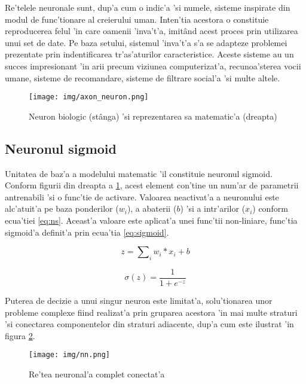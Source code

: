 \documentclass[12pt,a4paper,twoside]{report}
\begin{document}
Re'telele neuronale sunt, dup'a cum o indic'a 'si numele, sisteme inspirate din modul de func'tionare al creierului uman. Inten'tia acestora o constituie reproducerea felul 'in care oamenii 'inva't'a, imit\^and acest proces prin utilizarea unui set de date. Pe baza setului, sistemul 'inva't'a s'a se adapteze problemei prezentate prin indentificarea tr'as'aturilor caracteristice. Aceste sisteme au un succes impresionant 'in arii precum viziunea computerizat'a, recunoa'sterea vocii umane, sisteme de recomandare, sisteme de filtrare social'a 'si multe altele.

\begin{figure}[H]
  \centering
  \texttt{[image: img/axon\_neuron.png]}
  \centering
  \caption{Neuron biologic (st\^anga) 'si reprezentarea sa matematic'a (dreapta) \protect\footnotemark}
  \label{fig:axon_neuron}
\end{figure}

\newpage
\subsection{Neuronul sigmoid}
Unitatea de baz'a a modelului matematic 'il constituie neuronul sigmoid. Conform figurii din dreapta a \ref{fig:axon_neuron}, acest element con'tine un num'ar de parametrii antrenabili 'si o func'tie de activare. Valoarea neactivat'a a neuronului este alc'atuit'a pe baza ponderilor ($w_i$), a abaterii ($b$) 'si a intr'arilor ($x_i$) conform ecua'tiei \ref{eq:ns}. Aceast'a valoare este aplicat'a unei func'tii non-liniare, func'tia sigmoid'a definit'a prin ecua'tia \ref{eq:sigmoid}.

\begin{equation}
z = \sum\nolimits_{i} w_i * x_i + b
\label{eq:ns}
\end{equation}

\begin{equation}
\sigma(z) = \frac{1}{1+e^{- z}}
\label{eq:sigmoid}
\end{equation}

Puterea de decizie a unui singur neuron este limitat'a, solu'tionarea unor probleme complexe fiind realizat'a prin gruparea acestora 'in mai multe straturi 'si conectarea componentelor din straturi adiacente, dup'a cum este ilustrat 'in figura \ref{fig:nn}.

\begin{figure}[H]
  \texttt{[image: img/nn.png]}
  \centering
  \caption{Re'tea neuronal'a complet conectat'a \protect\footnotemark}
  \label{fig:nn}
\end{figure}
\end{document}
